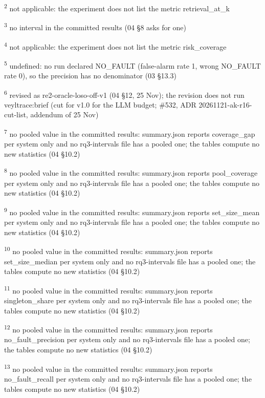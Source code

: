 \textsuperscript{2} not applicable: the experiment does not list the metric retrieval\_at\_k\par
\textsuperscript{3} no interval in the committed results (04 \S{}8 asks for one)\par
\textsuperscript{4} not applicable: the experiment does not list the metric risk\_coverage\par
\textsuperscript{5} undefined: no run declared NO\_FAULT (false-alarm rate 1, wrong NO\_FAULT rate 0), so the precision has no denominator (03 \S{}13.3)\par
\textsuperscript{6} revised as re2-oracle-loso-off-v1 (04 \S{}12, 25 Nov); the revision does not run veyltrace:brief (cut for v1.0 for the LLM budget; \#532, ADR 20261121-ak-r16-cut-list, addendum of 25 Nov)\par
\textsuperscript{7} no pooled value in the committed results: summary.json reports coverage\_gap per system only and no rq3-intervals file has a pooled one; the tables compute no new statistics (04 \S{}10.2)\par
\textsuperscript{8} no pooled value in the committed results: summary.json reports pool\_coverage per system only and no rq3-intervals file has a pooled one; the tables compute no new statistics (04 \S{}10.2)\par
\textsuperscript{9} no pooled value in the committed results: summary.json reports set\_size\_mean per system only and no rq3-intervals file has a pooled one; the tables compute no new statistics (04 \S{}10.2)\par
\textsuperscript{10} no pooled value in the committed results: summary.json reports set\_size\_median per system only and no rq3-intervals file has a pooled one; the tables compute no new statistics (04 \S{}10.2)\par
\textsuperscript{11} no pooled value in the committed results: summary.json reports singleton\_share per system only and no rq3-intervals file has a pooled one; the tables compute no new statistics (04 \S{}10.2)\par
\textsuperscript{12} no pooled value in the committed results: summary.json reports no\_fault\_precision per system only and no rq3-intervals file has a pooled one; the tables compute no new statistics (04 \S{}10.2)\par
\textsuperscript{13} no pooled value in the committed results: summary.json reports no\_fault\_recall per system only and no rq3-intervals file has a pooled one; the tables compute no new statistics (04 \S{}10.2)\par
